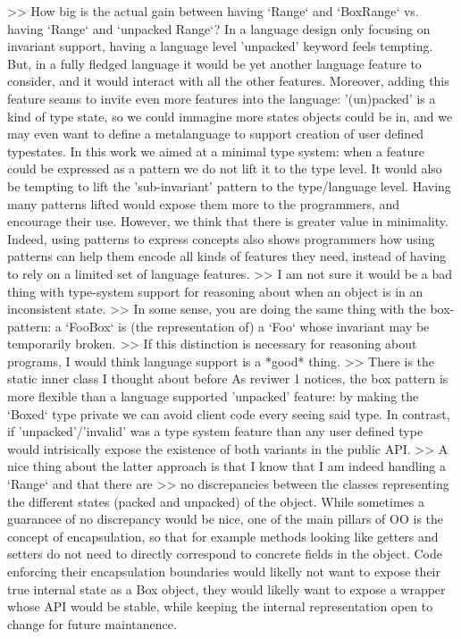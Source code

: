 >> How big is the actual gain between having `Range` and  `BoxRange` vs. having `Range` and `unpacked Range`?
In a language design only focusing on invariant support, having a language level 'unpacked' keyword feels tempting.
But, in a fully fledged language it would be yet another language feature to consider, and it would interact with all the other features.
Moreover, adding this feature seams to invite even more features into the language:
'(un)packed' is a kind of type state, so we could immagine more states objects could be in, and we may even want to define a metalanguage to support creation of user defined typestates.
In this work we aimed at a minimal type system: when a feature could be expressed as a pattern we do not lift it to the type level.
It would also be tempting to lift the 'sub-invariant' pattern to the type/language level.
Having many patterns lifted would expose them more to the programmers, and encourage their use.
However, we think that there is greater value in minimality.
Indeed, using patterns to express concepts also shows programmers how using patterns can help them encode all kinds of features they need, instead of having to rely on a limited set of language features.
>> I am not sure it would be a bad thing with type-system support for reasoning about when an object is in an inconsistent state.
>> In some sense, you are doing the same thing with the box-pattern: a `FooBox` is (the representation of) a `Foo` whose invariant may be temporarily broken.
>> If this distinction is necessary for reasoning about programs, I would think language support is a *good* thing.
>> There is the static inner class I thought about before
As reviwer 1 notices, the box pattern is more flexible than a language supported 'unpacked' feature:
by making the `Boxed` type private we can avoid client code every seeing said type.
In contrast, if 'unpacked'/'invalid' was a type system feature than any user defined type would intrisically expose the existence of both variants in the public API.
>> A nice thing  about the latter approach is that I know that I am indeed  handling a `Range` and that there are
>> no discrepancies between the classes representing the different states (packed and  unpacked) of the object.
While sometimes a guarancee of no discrepancy would be nice, one of the main pillars of OO is the concept of encapsulation, so that for example methods looking like getters and setters do not need to directly correspond to concrete fields in the object.
Code enforcing their encapsulation boundaries would likelly not want to expose their true internal state as a Box object, they would likelly want to expose a wrapper whose
API would be stable, while keeping the internal representation open to change for future maintanence.

